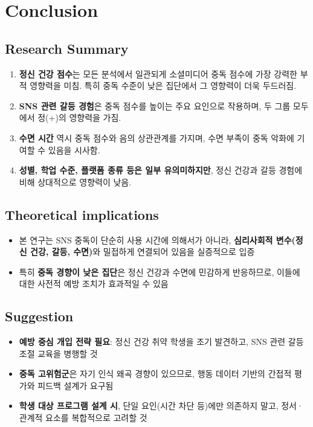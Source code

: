 \documentclass[11pt]{article}
\providecommand{\tightlist}{%
      \setlength{\itemsep}{0pt}\setlength{\parskip}{0pt}}
\begin{document}
    \section{Conclusion}\label{conclusion}

\subsection{Research Summary}\label{research-summary}

\begin{enumerate}
\def\labelenumi{\arabic{enumi}.}
\tightlist
\item
  \textbf{정신 건강 점수}는 모든 분석에서 일관되게 소셜미디어 중독
  점수에 가장 강력한 부적 영향력을 미침. 특히 중독 수준이 낮은 집단에서
  그 영향력이 더욱 두드러짐.
\item
  \textbf{SNS 관련 갈등 경험}은 중독 점수를 높이는 주요 요인으로
  작용하며, 두 그룹 모두에서 정(+)의 영향력을 가짐.
\item
  \textbf{수면 시간} 역시 중독 점수와 음의 상관관계를 가지며, 수면
  부족이 중독 악화에 기여할 수 있음을 시사함.
\item
  \textbf{성별, 학업 수준, 플랫폼 종류 등은 일부 유의미하지만}, 정신
  건강과 갈등 경험에 비해 상대적으로 영향력이 낮음.
\end{enumerate}

\subsection{Theoretical implications}\label{theoretical-implications}

\begin{itemize}
\tightlist
\item
  본 연구는 SNS 중독이 단순히 사용 시간에 의해서가 아니라,
  \textbf{심리사회적 변수(정신 건강, 갈등, 수면)}와 밀접하게 연결되어
  있음을 실증적으로 입증
\item
  특히 \textbf{중독 경향이 낮은 집단}은 정신 건강과 수면에 민감하게
  반응하므로, 이들에 대한 사전적 예방 조치가 효과적일 수 있음
\end{itemize}

\subsection{Suggestion}\label{suggestion}

\begin{itemize}
\tightlist
\item
  \textbf{예방 중심 개입 전략 필요}: 정신 건강 취약 학생을 조기
  발견하고, SNS 관련 갈등 조절 교육을 병행할 것
\item
  \textbf{중독 고위험군}은 자기 인식 왜곡 경향이 있으므로, 행동 데이터
  기반의 간접적 평가와 피드백 설계가 요구됨
\item
  \textbf{학생 대상 프로그램 설계 시}, 단일 요인(시간 차단 등)에만
  의존하지 말고, 정서·관계적 요소를 복합적으로 고려할 것
\end{itemize}


    
    
    
\end{document}
